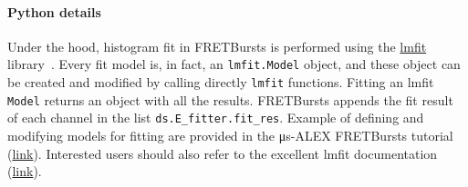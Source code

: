 \paragraph{Python details}
Under the hood, histogram fit in FRETBursts is performed using the
\href{http://lmfit.github.io/lmfit-py/}{lmfit} library~\cite{lmfit}.
Every fit model is, in fact, an \verb|lmfit.Model| object, and these object
can be created and modified by calling directly \verb|lmfit| functions.
Fitting an lmfit \verb|Model| returns an object with all the results.
FRETBursts appends the fit result of each channel in the list 
\verb|ds.E_fitter.fit_res|.
Example of defining and modifying models for fitting are provided in 
the μs-ALEX FRETBursts tutorial (\href{http://nbviewer.jupyter.org/github/tritemio/FRETBursts_notebooks/blob/master/notebooks/FRETBursts%20-%20us-ALEX%20smFRET%20burst%20analysis.ipynb}{link}). 
Interested users should also refer to the excellent lmfit documentation
(\href{http://lmfit.github.io/lmfit-py/}{link}).
